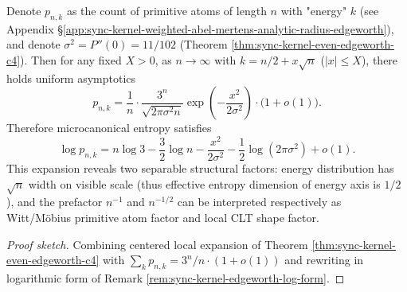 \begin{conclusion}\label{con:xi-terminal-primitive-microcanonical-dim-half}
Denote \(p_{n,k}\) as the count of primitive atoms of length \(n\) with "energy" \(k\) (see Appendix \S\ref{app:sync-kernel-weighted-abel-mertens-analytic-radius-edgeworth}), and denote
\(\sigma^2=P''(0)=11/102\) (Theorem \ref{thm:sync-kernel-even-edgeworth-c4}).
Then for any fixed \(X>0\), as \(n\to\infty\) with \(k=n/2+x\sqrt n\) (\(|x|\le X\)), there holds uniform asymptotics
\[
p_{n,k}
=\frac{1}{n}\cdot\frac{3^n}{\sqrt{2\pi\sigma^2 n}}
\exp\!\left(-\frac{x^2}{2\sigma^2}\right)\cdot\bigl(1+o(1)\bigr).
\]
Therefore microcanonical entropy satisfies
\[
\log p_{n,k}
=n\log3-\frac{3}{2}\log n-\frac{x^2}{2\sigma^2}-\frac{1}{2}\log(2\pi\sigma^2)+o(1).
\]
This expansion reveals two separable structural factors: energy distribution has \(\sqrt n\) width on visible scale (thus effective entropy dimension of energy axis is \(1/2\)),
and the prefactor \(n^{-1}\) and \(n^{-1/2}\) can be interpreted respectively as Witt/Möbius primitive atom factor and local CLT shape factor.
\end{conclusion}
\begin{proof}[Proof sketch]
Combining centered local expansion of Theorem \ref{thm:sync-kernel-even-edgeworth-c4} with
\(\sum_k p_{n,k}=3^n/n\cdot(1+o(1))\)
and rewriting in logarithmic form of Remark \ref{rem:sync-kernel-edgeworth-log-form}.
\end{proof}

